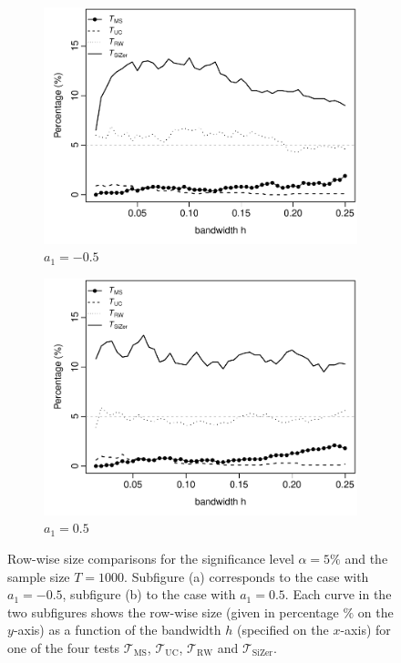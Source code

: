 \begin{figure}[t!]
\begin{subfigure}{.5\textwidth}
\centering
\includegraphics[width=\linewidth]{Plots/pcp_size_T_1000_a1_-50.pdf}
\caption{$a_1 = -0.5$}
\end{subfigure}
\begin{subfigure}{.5\textwidth}
\centering
\includegraphics[width=\linewidth]{Plots/pcp_size_T_1000_a1_50.pdf}
\caption{$a_1 = 0.5$}
\end{subfigure}
\caption{Row-wise size comparisons for the significance level $\alpha=5\%$ and the sample size $T=1000$. Subfigure (a) corresponds to the case with $a_1=-0.5$, subfigure (b) to the case with $a_1=0.5$. Each curve in the two subfigures shows the row-wise size (given in percentage $\%$ on the $y$-axis) as a function of the bandwidth $h$ (specified on the $x$-axis) for one of the four tests $\mathcal{T}_{\text{MS}}$, $\mathcal{T}_{\text{UC}}$, $\mathcal{T}_{\text{RW}}$ and $\mathcal{T}_{\text{SiZer}}$.}\label{fig:sim:size:compare}
\end{figure}



